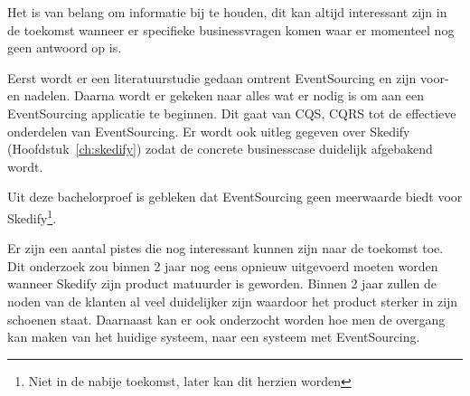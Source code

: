 Het is van belang om informatie bij te houden, dit kan altijd interessant zijn in de toekomst wanneer er specifieke businessvragen komen waar er momenteel nog geen antwoord op is.

Eerst wordt er een literatuurstudie gedaan omtrent EventSourcing en zijn voor- en nadelen.
Daarna wordt er gekeken naar alles wat er nodig is om aan een EventSourcing applicatie te beginnen. Dit gaat van \gls{CQS}, \gls{CQRS} tot de effectieve onderdelen van EventSourcing. Er wordt ook uitleg gegeven over Skedify (Hoofdstuk~\ref{ch:skedify}) zodat de concrete businesscase duidelijk afgebakend wordt.

Uit deze bachelorproef is gebleken dat EventSourcing geen meerwaarde biedt voor Skedify\footnote{Niet in de nabije toekomst, later kan dit herzien worden}.

Er zijn een aantal pistes die nog interessant kunnen zijn naar de toekomst toe. Dit onderzoek zou binnen 2 jaar nog eens opnieuw uitgevoerd moeten worden wanneer Skedify zijn product matuurder is geworden. Binnen 2 jaar zullen de noden van de klanten al veel duidelijker zijn waardoor het product sterker in zijn schoenen staat. Daarnaast kan er ook onderzocht worden hoe men de overgang kan maken van het huidige systeem, naar een systeem met EventSourcing.
